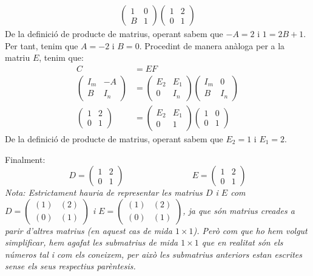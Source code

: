 \documentclass[11pt,a4paper]{article}
\begin{document}
\begin{enumerate}
\begin{align*}
   \begin{pmatrix}
   1 & 0 \\
   B & 1
   \end{pmatrix}
   \begin{pmatrix}
   1 & 2 \\
   0 & 1
   \end{pmatrix}
   \end{align*}
   De la definició de producte de matrius, operant sabem que $-A=2$ i $1=2B+1$. Per tant, tenim que $A=-2$ i $B=0$. Procedint de manera anàloga per a la matriu $E$, tenim que:
   \begin{align*}
       C&=EF \\
   \begin{pmatrix}
   I_m & -A \\
   B & I_n
   \end{pmatrix}&=
   \begin{pmatrix}
   E_2 & E_1 \\
   0 & I_n
   \end{pmatrix}
   \begin{pmatrix}
   I_m & 0 \\
   B & I_n
   \end{pmatrix} \\
   \begin{pmatrix}
   1 & 2 \\
   0 & 1
   \end{pmatrix}&=
   \begin{pmatrix}
   E_2 & E_1 \\
   0 & 1
   \end{pmatrix}
   \begin{pmatrix}
   1 & 0 \\
   0 & 1
   \end{pmatrix}
   \end{align*}
    De la definició de producte de matrius, operant sabem que $E_2=1$ i $E_1=2$.\par Finalment: $$D=\begin{pmatrix}
   1 & 2 \\
   0 & 1
   \end{pmatrix}\qquad\qquad\qquad\qquad E=\begin{pmatrix}
   1 & 2 \\
   0 & 1
   \end{pmatrix}$$
   \textit{Nota: Estrictament hauria de representar les matrius $D$ i $E$ com $D=\begin{pmatrix}
   (1) & (2) \\
   (0) & (1)
   \end{pmatrix}$ i $E=\begin{pmatrix}
   (1) & (2) \\
   (0) & (1)
   \end{pmatrix}$, ja que són matrius creades a parir d'altres matrius (en aquest cas de mida $1\times 1$). Però com que ho hem volgut simplificar, hem agafat les submatrius de mida $1\times 1$ que en realitat són els números tal i com els coneixem, per això les submatrius anteriors estan escrites sense els seus respectius parèntesis.}
   

\end{enumerate}
\end{document}
